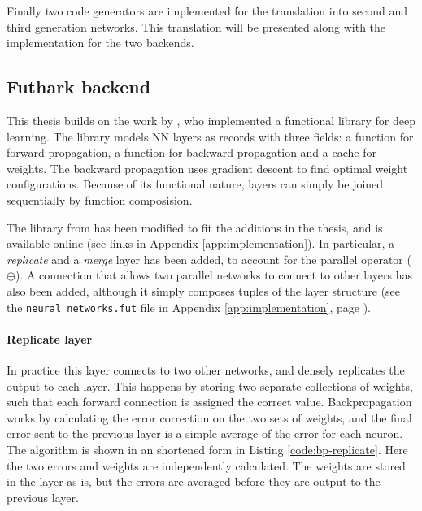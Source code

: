 Finally two code generators are implemented for the translation into
second and third generation networks.
This translation will be presented along with the implementation
for the two backends.

\subsection{Futhark backend} \label{sec:volr-futhark}
This thesis builds on the work by \textcite{Minh2018}, who 
implemented a functional library for deep learning.
The library models \gls{NN} layers as records with three fields:
a function for forward propagation, a function for backward propagation
and a cache for weights. 
The backward propagation uses gradient descent to find optimal
weight configurations.
Because of its functional nature, layers can simply be joined 
sequentially by function composision.

The library from \cite{Minh2018} has been modified to fit the
additions in the thesis, and is available online (see links in 
Appendix \ref{app:implementation}).
In particular, a \textit{replicate} and a \textit{merge} layer has
been added, to account for the parallel operator ($\ominus$).
A connection that allows two parallel networks to connect to other
layers has also been added, although it simply composes tuples of
the layer structure (see the \texttt{neural\_networks.fut} file in
Appendix \ref{app:implementation}, page \pageref{app:implementation_fut_nn}).

\paragraph{Replicate layer}
In practice this layer connects to two other networks, and densely
replicates the output to each layer.
This happens by storing two separate collections of weights, such
that each forward connection is assigned the correct value.
Backpropagation works by calculating the error correction on the
two sets of weights, and the final error sent to the previous layer
is a simple average of the error for each neuron. 
The algorithm is shown in an shortened form in Listing \ref{code:bp-replicate}.
Here the two errors and weights are independently calculated.
The weights are stored in the layer as-is, but the errors are 
averaged before they are output to the previous layer.

